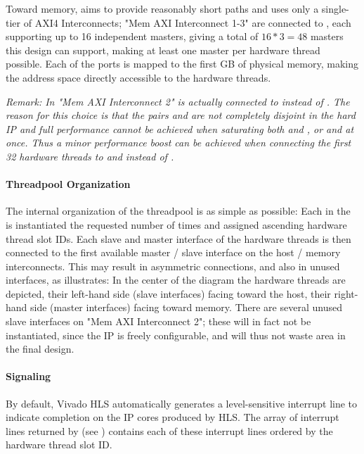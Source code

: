 \medskip
Toward memory,  aims to provide reasonably short paths and uses only a single-tier of AXI4 Interconnects; "Mem AXI Interconnect 1-3" are connected to , each supporting up to 16 independent masters, giving a total of $16 * 3 = 48$ masters this design can support, making at least one master per hardware thread possible.
Each of the  ports is mapped to the first GB of physical memory, making the address space  directly accessible to the hardware threads.

\medskip
\emph{Remark: In  "Mem AXI Interconnect 2" is actually connected to  instead of .
The reason for this choice is that the pairs  and  are not completely disjoint in the hard IP and full performance cannot be achieved when saturating both  and , or  and  at once.
Thus a minor performance boost can be achieved when connecting the first 32 hardware threads to  and  instead of .}

\paragraph{Threadpool Organization}
The internal organization of the threadpool is as simple as possible:
Each  in the  is instantiated the requested number of times and assigned ascending hardware thread slot IDs.
Each slave and master interface of the hardware threads is then connected to the first available master / slave interface on the host / memory interconnects.
This may result in asymmetric connections, and also in unused interfaces, as  illustrates:
In the center of the diagram the hardware threads are depicted, their left-hand side (slave interfaces) facing toward the host, their right-hand side (master interfaces) facing toward memory.
There are several unused slave interfaces on "Mem AXI Interconnect 2"; these will in fact not be instantiated, since the IP is freely configurable, and will thus not waste area in the final design.

\paragraph{Signaling}
By default, Vivado HLS automatically generates a level-sensitive interrupt line to indicate completion on the IP cores produced by HLS.
The array of interrupt lines returned by  (see ) contains each of these interrupt lines ordered by the hardware thread slot ID.

